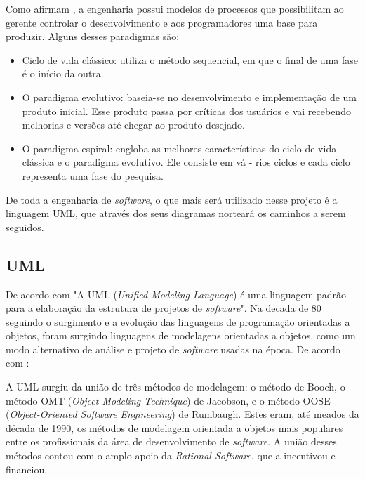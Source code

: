 	\par Como afirmam , a engenharia possui modelos de
processos que possibilitam ao gerente controlar o desenvolvimento e aos
programadores uma base para produzir. Alguns desses paradigmas são:

	\begin{itemize}
	  
	  \item Ciclo de vida clássico: utiliza o método sequencial, em que o final
	  de uma fase é o início da outra.
	  
	  \item O paradigma evolutivo: baseia-se no desenvolvimento e implementação
	  de um produto inicial. Esse produto passa por críticas dos usuários e vai
	  recebendo melhorias e versões até chegar ao produto desejado.
	  
	  \item O paradigma espiral: engloba as melhores características do ciclo de
	  vida clássica e o paradigma evolutivo. Ele consiste em vá - rios ciclos e
	  cada ciclo representa uma fase do pesquisa.
	
	\end{itemize}



	\par De toda a engenharia de \textit{software}, o que mais será utilizado nesse
projeto é a linguagem UML, que através dos seus diagramas norteará os caminhos
a serem seguidos.
	
	\subsection{UML}
		
		\par De acordo com  "A UML (\textit{Unified Modeling
	Language}) é uma linguagem-padrão para a elaboração da estrutura de projetos
	de \textit{software}". Na decada de 80 seguindo o surgimento e a evolução das
	linguagens de programação orientadas a objetos, foram surgindo linguagens de
	modelagens orientadas a objetos, como um modo alternativo de análise e projeto
	de \textit{software} usadas na época. De acordo com
	:
		\begin{citacao}
			A UML surgiu da união de três métodos de modelagem: o método de Booch, o
			método OMT (\textit{Object Modeling Technique}) de Jacobson, e o método OOSE
			(\textit{Object-Oriented Software Engineering}) de Rumbaugh. Estes eram, até
			meados da década de 1990, os métodos de modelagem orientada a objetos mais
			populares entre os profissionais da área de desenvolvimento de
			\textit{software}. A união desses métodos contou com o amplo apoio da
			\textit{Rational Software}, que a incentivou e financiou.
		\end{citacao}
		
